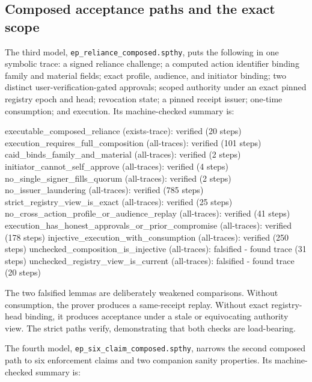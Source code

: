\documentclass[11pt]{article}
\newcommand{\code}[1]{\texttt{#1}}
\begin{document}
\subsection{Composed acceptance paths and the exact scope}

The third model, \code{ep\_reliance\_composed.spthy}, puts the following in one
symbolic trace: a signed reliance challenge; a computed action identifier binding
family and material fields; exact profile, audience, and initiator binding; two
distinct user-verification-gated approvals; scoped authority under an exact pinned
registry epoch and head; revocation state; a pinned receipt issuer; one-time
consumption; and execution. Its machine-checked summary is:

\begin{tool}
executable_composed_reliance (exists-trace): verified (20 steps)
execution_requires_full_composition (all-traces): verified (101 steps)
caid_binds_family_and_material (all-traces): verified (2 steps)
initiator_cannot_self_approve (all-traces): verified (4 steps)
no_single_signer_fills_quorum (all-traces): verified (2 steps)
no_issuer_laundering (all-traces): verified (785 steps)
strict_registry_view_is_exact (all-traces): verified (25 steps)
no_cross_action_profile_or_audience_replay (all-traces): verified (41 steps)
execution_has_honest_approvals_or_prior_compromise (all-traces): verified (178 steps)
injective_execution_with_consumption (all-traces): verified (250 steps)
unchecked_composition_is_injective (all-traces): falsified - found trace (31 steps)
unchecked_registry_view_is_current (all-traces): falsified - found trace (20 steps)
\end{tool}

The two falsified lemmas are deliberately weakened comparisons. Without consumption,
the prover produces a same-receipt replay. Without exact registry-head binding, it
produces acceptance under a stale or equivocating authority view. The strict paths
verify, demonstrating that both checks are load-bearing.

The fourth model, \code{ep\_six\_claim\_composed.spthy}, narrows the second
composed path to six enforcement claims and two companion sanity properties. Its
machine-checked summary is:
\end{document}
